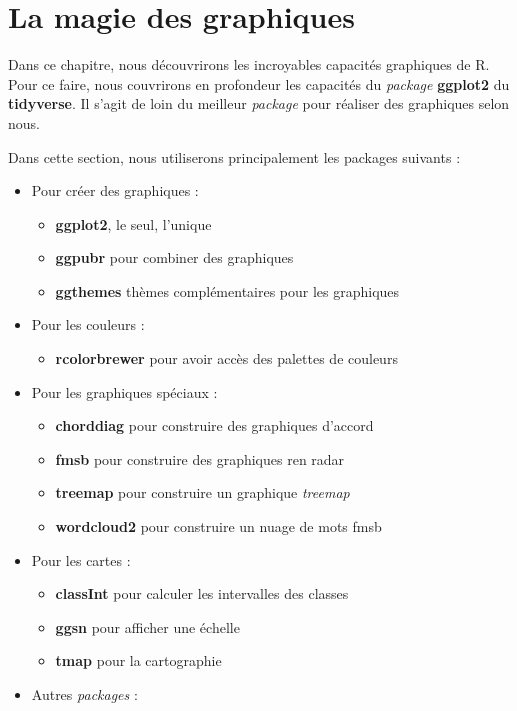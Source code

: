 \documentclass[
  11pt,
  french,
]{book}
\makeatletter
\providecommand{\tightlist}{%
  \setlength{\itemsep}{0pt}\setlength{\parskip}{0pt}}
\newenvironment{kframev}{%
\medskip{}
\setlength{\fboxsep}{.8em}
 \def\at@end@of@kframev{}%
 \ifinner\ifhmode%
  \def\at@end@of@kframev{\end{minipage}}%
  \begin{minipage}{\columnwidth}%
 \fi\fi%
 \def\FrameCommand##1{\hskip\@totalleftmargin \hskip-\fboxsep
 \colorbox{shadebluecolor}{##1}\hskip-\fboxsep
     \hskip-\linewidth \hskip-\@totalleftmargin \hskip\columnwidth}%
 \MakeFramed {\advance\hsize-\width
   \@totalleftmargin\z@ \linewidth\hsize
   \@setminipage}}%
 {\par\unskip\endMakeFramed%
 \at@end@of@kframev}
\newenvironment{rmdblock}[1]
  {
  \begin{itemize}
  \renewcommand{\labelitemi}{
    \raisebox{-.7\height}[0pt][0pt]{
      {\setkeys{Gin}{width=3em,keepaspectratio}\texttt{[image: images/\#1]}}
    }
  }
  \setlength{\fboxsep}{1em}
  \begin{kframev}
  \small
  \item
  }
  {
  \end{kframev}
  \end{itemize}
  }
\newenvironment{bloc_package}
  {\begin{rmdblock}{package}}
  {\end{rmdblock}}
\makeatother
\begin{document}
\hypertarget{chap03}{%
\chapter{La magie des graphiques}\label{chap03}}

Dans ce chapitre, nous découvrirons les incroyables capacités graphiques de R. Pour ce faire, nous couvrirons en profondeur les capacités du \emph{package} \textbf{ggplot2} du \textbf{tidyverse}. Il s'agit de loin du meilleur \emph{package} pour réaliser des graphiques selon nous.

\begin{bloc_package}

Dans cette section, nous utiliserons principalement les packages suivants :

\begin{itemize}
\tightlist
\item
  Pour créer des graphiques :

  \begin{itemize}
  \tightlist
  \item
    \textbf{ggplot2}, le seul, l'unique
  \item
    \textbf{ggpubr} pour combiner des graphiques
  \item
    \textbf{ggthemes} thèmes complémentaires pour les graphiques
  \end{itemize}
\item
  Pour les couleurs :

  \begin{itemize}
  \tightlist
  \item
    \textbf{rcolorbrewer} pour avoir accès des palettes de couleurs
  \end{itemize}
\item
  Pour les graphiques spéciaux :

  \begin{itemize}
  \tightlist
  \item
    \textbf{chorddiag} pour construire des graphiques d'accord
  \item
    \textbf{fmsb} pour construire des graphiques ren radar
  \item
    \textbf{treemap} pour construire un graphique \emph{treemap}
  \item
    \textbf{wordcloud2} pour construire un nuage de mots
    fmsb
  \end{itemize}
\item
  Pour les cartes :

  \begin{itemize}
  \tightlist
  \item
    \textbf{classInt} pour calculer les intervalles des classes
  \item
    \textbf{ggsn} pour afficher une échelle
  \item
    \textbf{tmap} pour la cartographie
  \end{itemize}
\item
  Autres \emph{packages} :


\end{itemize}
\end{bloc_package}
\end{document}
